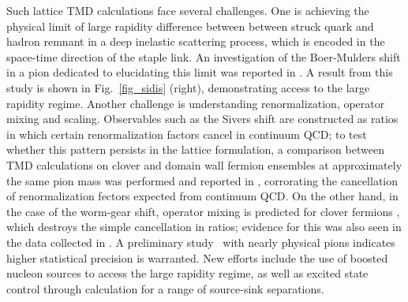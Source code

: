 Such lattice TMD calculations face several challenges. One is achieving
the physical limit of large rapidity difference between between struck
quark and hadron remnant in a deep inelastic scattering process, which
is encoded in the space-time direction of the staple link. An investigation
of the Boer-Mulders shift in a pion dedicated to elucidating this limit
was reported in \cite{Engelhardt:2015xja}. A result from this study is
shown in Fig.~\ref{fig_sidis} (right), demonstrating access to the large
rapidity regime. Another challenge is understanding renormalization,
operator mixing and scaling. Observables such as the Sivers shift are
constructed as ratios in which certain renormalization factors cancel
in continuum QCD; to test whether this pattern persists in the lattice
formulation, a comparison between TMD calculations on clover and domain
wall fermion ensembles at approximately the same pion mass was performed
and reported in \cite{Yoon:2017qzo}, corrorating the cancellation of 
renormalization fectors expected from continuum QCD.
On the other hand,
in the case of the worm-gear shift, operator mixing is predicted for
clover fermions \cite{Constantinou:2017sej}, which destroys the simple
cancellation in ratios; evidence for this was also seen in the data
collected in \cite{Yoon:2017qzo}.
A preliminary study~\cite{Engelhardt:2015czw} with nearly physical
pions indicates higher statistical precision is warranted. New efforts
include the use of boosted nucleon sources to access the large
rapidity regime, as well as excited state control through calculation
for a range of source-sink separations.

%

